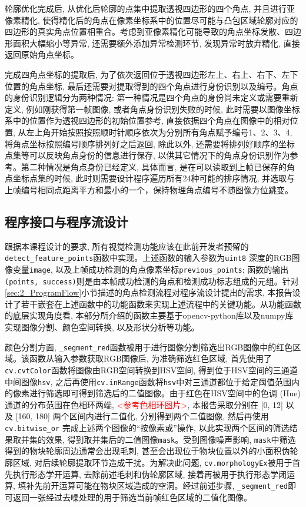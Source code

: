 轮廓优化完成后, 从优化后轮廓的点集中提取透视四边形的四个角点, 并且进行亚像素精化, 使得精化后的角点在像素坐标系中的位置尽可能与凸包区域轮廓对应的四边形的真实角点位置相重合。考虑到亚像素精化可能导致的角点坐标发散、四边形面积大幅缩小等异常, 还需要额外添加异常检测环节, 发现异常时放弃精化, 直接返回原始角点坐标。

完成四角点坐标的提取后, 为了依次返回位于透视四边形左上、右上、右下、左下位置的角点坐标, 最后还需要对提取得到的四个角点进行身份识别以及编号。角点的身份识别逻辑分为两种情况: 第一种情况是四个角点的身份尚未定义或需要重新定义, 例如刚获得第一帧图像, 或者角点身份识别失败的时候, 此时需要以图像坐标系中的位置作为透视四边形的初始位置参考, 直接依据四个角点在图像中的相对位置, 从左上角开始按照按照顺时针顺序依次为分别所有角点赋予编号1、2、3、4, 将角点坐标按照编号顺序排列好之后返回, 除此以外, 还需要将排列好顺序的坐标点集等可以反映角点身份的信息进行保存, 以供其它情况下的角点身份识别作为参考。第二种情况是角点身份已经定义, 具体而言, 是在可以读取到上帧已保存的角点坐标点集的时候, 此时则需要设计程序遍历所有24种可能的排序情况, 并选取与上帧编号相同点距离平方和最小的一个，保持物理角点编号不随图像方位跳变。

\subsection{程序接口与程序流设计}
\label{sec:2_Interfaces}

跟据本课程设计的要求, 所有视觉检测功能应该在此前开发者预留的\texttt{detect\_feature\_points}函数中实现。上述函数的输入参数为\texttt{uint8} 深度的RGB图像变量\texttt{image}, 以及上帧成功检测的角点像素坐标\texttt{previous\_points}; 函数的输出 \texttt{(points, success)}则是由本帧成功检测的角点和检测成功标志组成的元组。针对\ref{sec:2_ProgramFlow}小节描述的角点检测流程对程序流设计提出的需求, 本报告设计了若干嵌套在上述函数中的功能函数来实现上述流程中的关键功能。从功能函数的底层实现角度看, 本部分所介绍的函数主要基于opencv-python库以及numpy库实现图像分割、颜色空间转换, 以及形状分析等功能。

颜色分割方面, \texttt{\_segment\_red}函数被用于进行图像分割筛选出RGB图像中的红色区域。该函数从输入参数获取RGB图像后, 为准确筛选红色区域, 首先使用了\texttt{cv.cvtColor}函数将图像由RGB空间转换到HSV空间, 得到位于HSV空间的三通道中间图像\texttt{hsv}, 之后再使用\texttt{cv.inRange}函数将\texttt{hsv}中对三通道都位于给定阈值范围内的像素进行筛选即可得到筛选后的二值图像。由于红色在HSV空间中的色调 (Hue) 通道的分布范围在色相环两端, \textcolor{red}{<参考色相环图片>}, 本报告采取分别在 [0, 12] 以及 [160, 180] 两个区间内进行二值化, 分别得到两个二值图像, 然后再使用\texttt{cv.bitwise\_or} 完成上述两个图像的``按像素或''操作, 以此实现两个区间的筛选结果取并集的效果, 得到取并集后的二值图像\texttt{mask}。受到图像噪声影响, \texttt{mask}中筛选得到的物块轮廓周边通常会出现毛刺, 甚至会出现位于物块位置以外的小面积伪轮廓区域, 对后续轮廓提取环节造成干扰。为解决此问题, \texttt{cv.morphologyEx}被用于首先执行形态学开运算, 去除前述毛刺和伪轮廓区域, 接着再被用于执行形态学闭运算, 填补先前开运算可能在物块区域造成的空洞。经过前述步骤, \texttt{\_segment\_red}即可返回一张经过去噪处理的用于筛选当前帧红色区域的二值化图像。

